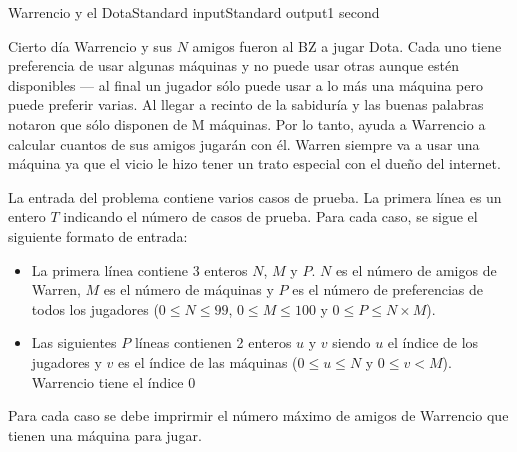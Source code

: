 \begin{problem}{Warrencio y el Dota}{Standard input}{Standard output}{1 second}{}


Cierto día Warrencio y sus $N$ amigos fueron al BZ a jugar Dota. Cada uno tiene preferencia de usar algunas máquinas y no puede usar otras aunque estén disponibles --- al final un jugador sólo puede usar a lo más una máquina pero puede preferir varias. Al llegar a recinto de la sabiduría y las buenas palabras notaron que sólo disponen de M máquinas. Por lo tanto, ayuda a Warrencio a calcular cuantos de sus amigos jugarán con él. Warren siempre va a usar una máquina ya que el vicio le hizo tener un trato especial con el dueño del internet.

\InputFile
La entrada del problema contiene varios casos de prueba. La primera línea es un entero $T$ indicando el número de casos de prueba. Para cada caso, se sigue el siguiente formato de entrada:

\begin{itemize}
\item La primera línea contiene 3 enteros $N$, $M $ y $P$. $N$ es el número de amigos de Warren, $M$ es el número de máquinas y $P$ es el número de preferencias de todos los jugadores ($0 \leq N \leq 99$, $0 \leq M \leq 100$ y $0 \leq P \leq N\times M$).

\item Las siguientes $P$ líneas contienen 2 enteros $u$ y $v$ siendo $u$ el índice de los jugadores y $v$ es el índice de las máquinas ($0 \leq u \leq N$  y $0 \leq v<M$). Warrencio tiene el índice $0$
\end{itemize}

\OutputFile
Para cada caso se debe imprirmir el número máximo de amigos de Warrencio que tienen una máquina para jugar.  

\Example

\begin{example}
\end{example}

\end{problem}
